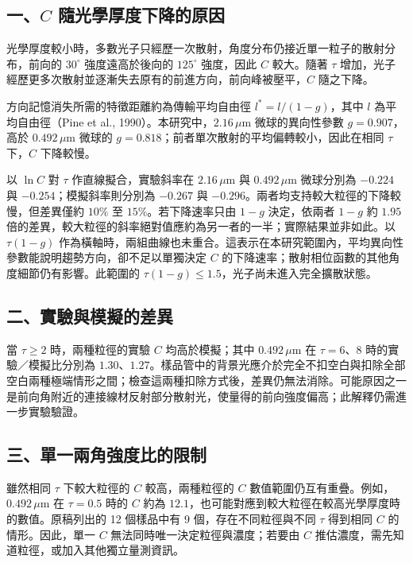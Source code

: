 \subsection*{一、$C$ 隨光學厚度下降的原因}
光學厚度較小時，多數光子只經歷一次散射，角度分布仍接近單一粒子的散射分布，前向的 $30^\circ$ 強度遠高於後向的 $125^\circ$ 強度，因此 $C$ 較大。隨著 $\tau$ 增加，光子經歷更多次散射並逐漸失去原有的前進方向，前向峰被壓平，$C$ 隨之下降。

方向記憶消失所需的特徵距離約為傳輸平均自由徑 $l^*=l/(1-g)$，其中 $l$ 為平均自由徑（Pine et al., 1990）。本研究中，$2.16\,\mu\mathrm{m}$ 微球的異向性參數 $g=0.907$，高於 $0.492\,\mu\mathrm{m}$ 微球的 $g=0.818$；前者單次散射的平均偏轉較小，因此在相同 $\tau$ 下，$C$ 下降較慢。

以 $\ln C$ 對 $\tau$ 作直線擬合，實驗斜率在 $2.16\,\mu\mathrm{m}$ 與 $0.492\,\mu\mathrm{m}$ 微球分別為 $-0.224$ 與 $-0.254$；模擬斜率則分別為 $-0.267$ 與 $-0.296$。兩者均支持較大粒徑的下降較慢，但差異僅約 $10\%$ 至 $15\%$。若下降速率只由 $1-g$ 決定，依兩者 $1-g$ 約 $1.95$ 倍的差異，較大粒徑的斜率絕對值應約為另一者的一半；實際結果並非如此。以 $\tau(1-g)$ 作為橫軸時，兩組曲線也未重合。這表示在本研究範圍內，平均異向性參數能說明趨勢方向，卻不足以單獨決定 $C$ 的下降速率；散射相位函數的其他角度細節仍有影響。此範圍的 $\tau(1-g)\leq1.5$，光子尚未進入完全擴散狀態。

\subsection*{二、實驗與模擬的差異}
當 $\tau\geq2$ 時，兩種粒徑的實驗 $C$ 均高於模擬；其中 $0.492\,\mu\mathrm{m}$ 在 $\tau=6$、$8$ 時的實驗／模擬比分別為 $1.30$、$1.27$。樣品管中的背景光應介於完全不扣空白與扣除全部空白兩種極端情形之間；檢查這兩種扣除方式後，差異仍無法消除。可能原因之一是前向角附近的連接線材反射部分散射光，使量得的前向強度偏高；此解釋仍需進一步實驗驗證。

\subsection*{三、單一兩角強度比的限制}
雖然相同 $\tau$ 下較大粒徑的 $C$ 較高，兩種粒徑的 $C$ 數值範圍仍互有重疊。例如，$0.492\,\mu\mathrm{m}$ 在 $\tau=0.5$ 時的 $C$ 約為 $12.1$，也可能對應到較大粒徑在較高光學厚度時的數值。原稿列出的 12 個樣品中有 9 個，存在不同粒徑與不同 $\tau$ 得到相同 $C$ 的情形。因此，單一 $C$ 無法同時唯一決定粒徑與濃度；若要由 $C$ 推估濃度，需先知道粒徑，或加入其他獨立量測資訊。

